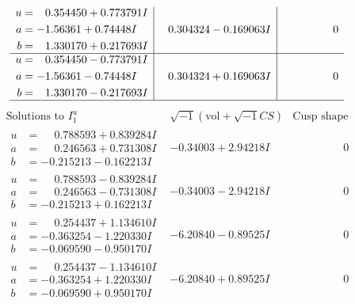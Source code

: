 \documentclass[1p]{elsarticle_modified}
\theoremstyle{definition}
\newcommand{\I}{\sqrt{-1}}
\begin{document}
$$\begin{array}{c|c|c}
\begin{aligned}
u &= \phantom{-}0.354450 + 0.773791 I \\
a &= -1.56361 + 0.74448 I \\
b &= \phantom{-}1.330170 + 0.217693 I\end{aligned}
 & \phantom{-}0.304324 - 0.169063 I & \phantom{-0.000000 } 0 \\ \hline\begin{aligned}
u &= \phantom{-}0.354450 - 0.773791 I \\
a &= -1.56361 - 0.74448 I \\
b &= \phantom{-}1.330170 - 0.217693 I\end{aligned}
 & \phantom{-}0.304324 + 0.169063 I & \phantom{-0.000000 } 0\\
 \hline 
 \end{array}$$\newpage$$\begin{array}{c|c|c}  
\text{Solutions to }I^u_{1}& \I (\text{vol} + \sqrt{-1}CS) & \text{Cusp shape}\\
 \hline 
\begin{aligned}
u &= \phantom{-}0.788593 + 0.839284 I \\
a &= \phantom{-}0.246563 + 0.731308 I \\
b &= -0.215213 - 0.162213 I\end{aligned}
 & -0.34003 + 2.94218 I & \phantom{-0.000000 } 0 \\ \hline\begin{aligned}
u &= \phantom{-}0.788593 - 0.839284 I \\
a &= \phantom{-}0.246563 - 0.731308 I \\
b &= -0.215213 + 0.162213 I\end{aligned}
 & -0.34003 - 2.94218 I & \phantom{-0.000000 } 0 \\ \hline\begin{aligned}
u &= \phantom{-}0.254437 + 1.134610 I \\
a &= -0.363254 - 1.220330 I \\
b &= -0.069590 - 0.950170 I\end{aligned}
 & -6.20840 - 0.89525 I & \phantom{-0.000000 } 0 \\ \hline\begin{aligned}
u &= \phantom{-}0.254437 - 1.134610 I \\
a &= -0.363254 + 1.220330 I \\
b &= -0.069590 + 0.950170 I\end{aligned}
 & -6.20840 + 0.89525 I & \phantom{-0.000000 } 0 \\ \hline\begin{aligned}

\end{aligned}
\end{array}$$
\end{document}
